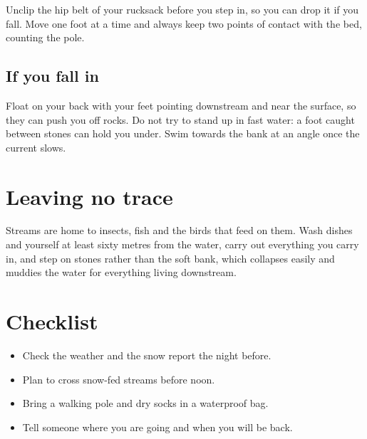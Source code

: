 \documentclass[11pt]{article}
\begin{document}
Unclip the hip belt of your rucksack before you step in, so you can drop it if
you fall. Move one foot at a time and always keep two points of contact with the
bed, counting the pole.

\subsection{If you fall in}

Float on your back with your feet pointing downstream and near the surface, so
they can push you off rocks. Do not try to stand up in fast water: a foot caught
between stones can hold you under. Swim towards the bank at an angle once the
current slows.

\section{Leaving no trace}

Streams are home to insects, fish and the birds that feed on them. Wash dishes
and yourself at least sixty metres from the water, carry out everything you
carry in, and step on stones rather than the soft bank, which collapses easily
and muddies the water for everything living downstream.

\section{Checklist}

\begin{itemize}
\item Check the weather and the snow report the night before.
\item Plan to cross snow-fed streams before noon.
\item Bring a walking pole and dry socks in a waterproof bag.
\item Tell someone where you are going and when you will be back.
\end{itemize}
\end{document}
